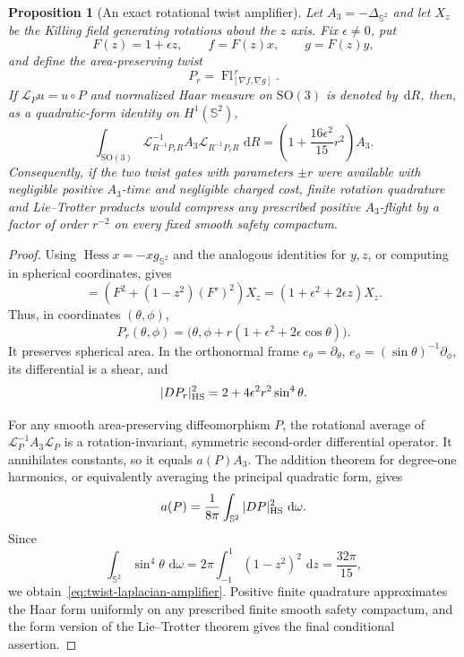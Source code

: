 \documentclass[11pt]{article}
\newtheorem{proposition}[theorem]{Proposition}
\theoremstyle{remark}
\newcommand{\dd}{\,\mathrm d}
\begin{document}
\begin{proposition}[An exact rotational twist amplifier]
\label{prop:twist-laplacian-amplifier}
Let $A_3=-\Delta_{\mathbb S^2}$ and let $X_z$ be the Killing field generating
rotations about the $z$ axis.  Fix $\epsilon\neq0$, put
\[
 F(z)=1+\epsilon z,\qquad
 f=F(z)x,\qquad g=F(z)y,
\]
and define the area-preserving twist
\[
 P_r=\operatorname{Fl}^{\,r}_{[\nabla f,\nabla g]}.
\]
If $\mathcal L_Pu=u\circ P$ and normalized Haar measure on
$\mathrm{SO}(3)$ is denoted by $\dd R$, then, as a quadratic-form identity
on $H^1(\mathbb S^2)$,
\begin{equation}
 \int_{\mathrm{SO}(3)}
 \mathcal L_{R^{-1}P_rR}^{-1}A_3
 \mathcal L_{R^{-1}P_rR}\,\dd R
 =
 \left(1+\frac{16\epsilon^2}{15}r^2\right)A_3.
 \label{eq:twist-laplacian-amplifier}
\end{equation}
Consequently, if the two twist gates with parameters $\pm r$ were available
with negligible positive $A_3$-time and negligible charged cost, finite
rotation quadrature and Lie--Trotter products would compress any prescribed
positive $A_3$-flight by a factor of order $r^{-2}$ on every fixed smooth
safety compactum.
\end{proposition}

\begin{proof}
Using $\operatorname{Hess}x=-xg_{\mathbb S^2}$ and the analogous identities
for $y,z$, or computing in spherical coordinates, gives
\begin{equation}
 [\nabla(Fx),\nabla(Fy)]
 =
 \left(F^2+(1-z^2)(F')^2\right)X_z
 =
 (1+\epsilon^2+2\epsilon z)X_z.
 \label{eq:twist-bracket}
\end{equation}
Thus, in coordinates $(\theta,\phi)$,
\[
 P_r(\theta,\phi)
 =
 \bigl(\theta,\phi+r(1+\epsilon^2+2\epsilon\cos\theta)\bigr).
\]
It preserves spherical area.  In the orthonormal frame
$e_\theta=\partial_\theta$,
$e_\phi=(\sin\theta)^{-1}\partial_\phi$, its differential is a shear, and
\[
 |DP_r|_{\rm HS}^2
 =
 2+4\epsilon^2r^2\sin^4\theta.
\]

For any smooth area-preserving diffeomorphism $P$, the rotational average of
$\mathcal L_P^{-1}A_3\mathcal L_P$ is a rotation-invariant, symmetric
second-order differential operator.  It annihilates constants, so it equals
$a(P)A_3$.  The addition theorem for degree-one harmonics, or equivalently
averaging the principal quadratic form, gives
\[
 a(P)=\frac1{8\pi}\int_{\mathbb S^2}|DP|_{\rm HS}^2\,\dd\omega.
\]
Since
\[
 \int_{\mathbb S^2}\sin^4\theta\,\dd\omega
 =
 2\pi\int_{-1}^{1}(1-z^2)^2\,\dd z
 =
 \frac{32\pi}{15},
\]
we obtain~\eqref{eq:twist-laplacian-amplifier}.  Positive finite quadrature
approximates the Haar form uniformly on any prescribed finite smooth safety
compactum, and the form version of the Lie--Trotter theorem gives the final
conditional assertion.
\end{proof}
\end{document}
